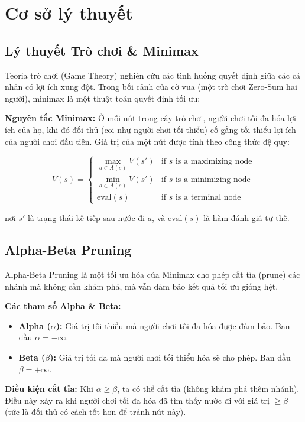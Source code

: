\section{Cơ sở lý thuyết}

\subsection{Lý thuyết Trò chơi \& Minimax}
Teoria trò chơi (Game Theory) nghiên cứu các tình huống quyết định giữa các cá nhân có lợi ích xung đột. Trong bối cảnh của cờ vua (một trò chơi Zero-Sum hai người), minimax là một thuật toán quyết định tối ưu:

\textbf{Nguyên tắc Minimax:} Ở mỗi nút trong cây trò chơi, người chơi tối đa hóa lợi ích của họ, khi đó đối thủ (coi như người chơi tối thiểu) cố gắng tối thiểu lợi ích của người chơi đầu tiên. Giá trị của một nút được tính theo công thức đệ quy:

\begin{equation*}
V(s) = \begin{cases}
\max_{a \in A(s)} V(s') & \text{if } s \text{ is a maximizing node} \\
\min_{a \in A(s)} V(s') & \text{if } s \text{ is a minimizing node} \\
\text{eval}(s) & \text{if } s \text{ is a terminal node}
\end{cases}
\end{equation*}

nơi $s'$ là trạng thái kế tiếp sau nước đi $a$, và $\text{eval}(s)$ là hàm đánh giá tư thế.

\subsection{Alpha-Beta Pruning}
Alpha-Beta Pruning là một tối ưu hóa của Minimax cho phép cắt tỉa (prune) các nhánh mà không cần khám phá, mà vẫn đảm bảo kết quả tối ưu giống hệt.

\textbf{Các tham số Alpha \& Beta:}
\begin{itemize}
    \item \textbf{Alpha ($\alpha$):} Giá trị tối thiểu mà người chơi tối đa hóa được đảm bảo. Ban đầu $\alpha = -\infty$.
    \item \textbf{Beta ($\beta$):} Giá trị tối đa mà người chơi tối thiểu hóa sẽ cho phép. Ban đầu $\beta = +\infty$.
\end{itemize}

\textbf{Điều kiện cắt tỉa:}
Khi $\alpha \geq \beta$, ta có thể cắt tỉa (không khám phá thêm nhánh). Điều này xảy ra khi người chơi tối đa hóa đã tìm thấy nước đi với giá trị $\geq \beta$ (tức là đối thủ có cách tốt hơn để tránh nút này).

